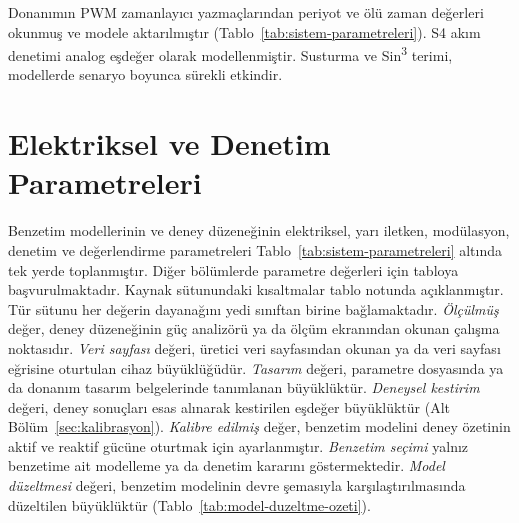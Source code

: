Donanımın PWM zamanlayıcı yazmaçlarından periyot ve ölü zaman değerleri okunmuş ve modele aktarılmıştır (Tablo~\ref{tab:sistem-parametreleri}). S4 akım denetimi analog eşdeğer olarak modellenmiştir. Susturma ve Sin\textsuperscript{3} terimi, modellerde senaryo boyunca sürekli etkindir.

\section{Elektriksel ve Denetim Parametreleri}

Benzetim modellerinin ve deney düzeneğinin elektriksel, yarı iletken, modülasyon, denetim ve değerlendirme parametreleri Tablo~\ref{tab:sistem-parametreleri} altında tek yerde toplanmıştır. Diğer bölümlerde parametre değerleri için tabloya başvurulmaktadır. Kaynak sütunundaki kısaltmalar tablo notunda açıklanmıştır. Tür sütunu her değerin dayanağını yedi sınıftan birine bağlamaktadır. \emph{Ölçülmüş} değer, deney düzeneğinin güç analizörü ya da ölçüm ekranından okunan çalışma noktasıdır. \emph{Veri sayfası} değeri, üretici veri sayfasından okunan ya da veri sayfası eğrisine oturtulan cihaz büyüklüğüdür. \emph{Tasarım} değeri, parametre dosyasında ya da donanım tasarım belgelerinde tanımlanan büyüklüktür. \emph{Deneysel kestirim} değeri, deney sonuçları esas alınarak kestirilen eşdeğer büyüklüktür (Alt Bölüm~\ref{sec:kalibrasyon}). \emph{Kalibre edilmiş} değer, benzetim modelini deney özetinin aktif ve reaktif gücüne oturtmak için ayarlanmıştır. \emph{Benzetim seçimi} yalnız benzetime ait modelleme ya da denetim kararını göstermektedir. \emph{Model düzeltmesi} değeri, benzetim modelinin devre şemasıyla karşılaştırılmasında düzeltilen büyüklüktür (Tablo~\ref{tab:model-duzeltme-ozeti}).

